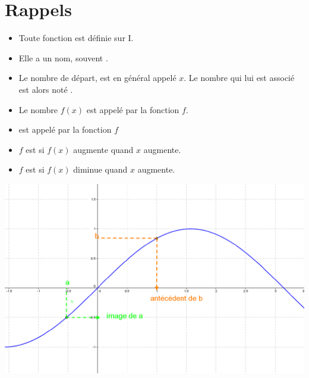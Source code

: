 \documentclass[12pt,a4paper]{article}
\date{}
\title{}
\begin{document}
{}

\section{Rappels}



\begin{mydefs}
	
	\begin{itemize}
		\item Toute fonction est définie sur  I.
		
		\item Elle a un nom, souvent .
		
		\item Le nombre de départ,  est en général appelé $x$. Le nombre qui lui est associé est alors noté .
		
		\item Le nombre $f(x)$ est appelé  par la fonction $f$.
		
		\item {} est appelé  par la fonction $f$
		
		\item $f$ est  si $f(x)$ augmente quand $x$ augmente.
		
		\item $f$ est  si $f(x)$ diminue quand $x$ augmente.
	\end{itemize}
	

\end{mydefs}

\begin{myillus}
	{\centering \includegraphics[scale=0.5]{./img/voc}}
\end{myillus}
\end{document}
